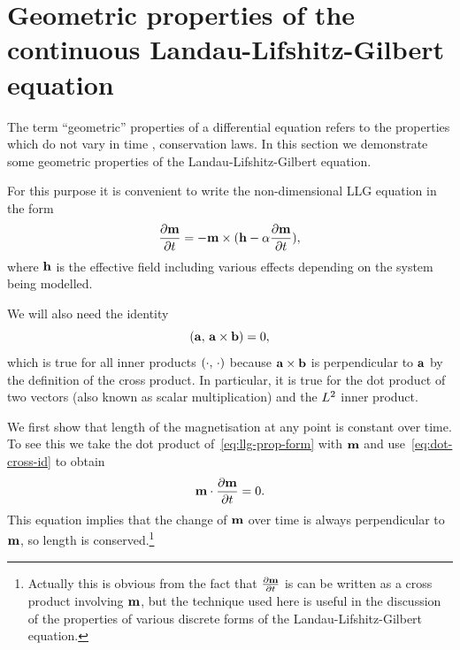 \section{Geometric properties of the continuous Landau-Lifshitz-Gilbert equation}
\label{sec:prop-cont-llg}

The term ``geometric'' properties of a differential equation refers to the properties which do not vary in time \cite[73]{Iserles2009}, \ie conservation laws.
In this section we demonstrate some geometric properties of the Landau-Lifshitz-Gilbert equation.

For this purpose it is convenient to write the non-dimensional LLG equation in the form
\begin{equation}
  \label{eq:llg-prop-form}
  \frac{\partial \mathbf{m}}{\partial t} = - \mathbf{m} \times( \mathbf{h} - \alpha \frac{\partial \mathbf{m}}{\partial t}),
\end{equation}
where $\mathbf{h}$ is the effective field including various effects depending on the system being modelled.

We will also need the identity
\begin{equation}
  \label{eq:dot-cross-id}
  \left({\mathbf{a}},\, {\mathbf{a}} \times {\mathbf{b}} \right) = 0,
\end{equation}
which is true for all inner products $\left(\cdot,\, \cdot \right)$ because ${\mathbf{a}} \times {\mathbf{b}}$ is perpendicular to ${\mathbf{a}}$ by the definition of the cross product.
In particular, it is true for the dot product of two vectors (also known as scalar multiplication) and the $L^2$ inner product.

We first show that length of the magnetisation at any point is constant over time.
To see this we take the dot product of~\cref{eq:llg-prop-form} with $\mathbf{m}$ and use~\cref{eq:dot-cross-id} to obtain
\begin{equation}
  \label{eq:56}
  \mathbf{m} \cdot \frac{\partial \mathbf{m}}{\partial t} = 0.
\end{equation}
This equation implies that the change of $\mathbf{m}$ over time is always perpendicular to $\mathbf{m}$, so length is conserved.\footnote{Actually this is obvious from the fact that $\frac{\partial \mathbf{m}}{\partial t}$ is can be written as a cross product involving $\mathbf{m}$, but the technique used here is useful in the discussion of the properties of various discrete forms of the Landau-Lifshitz-Gilbert equation.}

